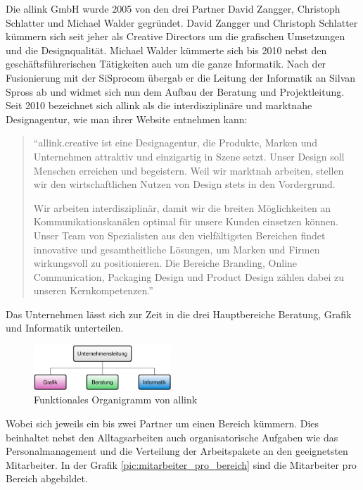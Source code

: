 Die allink GmbH wurde 2005 von den drei Partner David Zangger, Christoph Schlatter
und Michael Walder gegründet. David Zangger und Christoph Schlatter kümmern sich
seit jeher als Creative Directors um die grafischen Umsetzungen und die Designqualität.
Michael Walder kümmerte sich bis 2010 nebst den geschäftsführerischen Tätigkeiten
auch um die ganze Informatik. Nach der Fusionierung mit der SiSprocom übergab
er die Leitung der Informatik an Silvan Spross ab und widmet sich nun dem Aufbau der
Beratung und Projektleitung. Seit 2010 bezeichnet sich allink als die interdisziplinäre 
und marktnahe Designagentur, wie man ihrer Website entnehmen kann:

\begin{quote}
``allink.creative ist eine Designagentur, die Produkte, Marken und Unternehmen 
attraktiv und einzigartig in Szene setzt. Unser Design soll Menschen erreichen 
und begeistern. Weil wir marktnah arbeiten, stellen wir den wirtschaftlichen 
Nutzen von Design stets in den Vordergrund.

Wir arbeiten interdisziplinär, damit wir die breiten Möglichkeiten an 
Kommunikationskanälen optimal für unsere Kunden einsetzen können. Unser 
Team von Spezialisten aus den vielfältigsten Bereichen findet innovative 
und gesamtheitliche Lösungen, um Marken und Firmen wirkungsvoll zu positionieren. 
Die Bereiche Branding, Online Communication, Packaging Design und Product 
Design zählen dabei zu unseren Kernkompetenzen.''
\end{quote}

Das Unternehmen lässt sich zur Zeit in die drei Hauptbereiche Beratung, Grafik
und Informatik unterteilen.

\begin{figure}[htbp]
\begin{center}
\includegraphics[width=0.46\textwidth,angle=0]{./bilder/analyse/04_funktionales_organigramm.pdf}
\caption{Funktionales Organigramm von allink}
\label{pic:04_funktionales_organigramm}
\end{center}
\end{figure}

Wobei sich jeweils ein bis zwei Partner um einen
Bereich kümmern. Dies beinhaltet nebst den Alltagsarbeiten auch organisatorische 
Aufgaben wie das Personalmanagement und die Verteilung der Arbeitspakete an den 
geeignetsten Mitarbeiter. In der Grafik \ref{pic:mitarbeiter_pro_bereich} 
sind die Mitarbeiter pro Bereich abgebildet.


